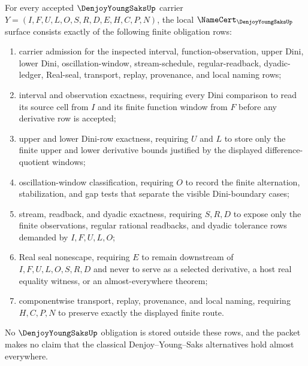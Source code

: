\begin{theorem}\label{thm:denjoy-young-saks-namecert-obligations}
For every accepted $\DenjoyYoungSaksUp$ carrier $Y=(I,F,U,L,O,S,R,D,E,H,C,P,N)$, the local $\NameCert_{\DenjoyYoungSaksUp}$ surface consists exactly of the following finite obligation rows:
\begin{enumerate}
\item carrier admission for the inspected interval, function-observation, upper Dini, lower Dini, oscillation-window, stream-schedule, regular-readback, dyadic-ledger, Real-seal, transport, replay, provenance, and local naming rows;
\item interval and observation exactness, requiring every Dini comparison to read its source cell from $I$ and its finite function window from $F$ before any derivative row is accepted;
\item upper and lower Dini-row exactness, requiring $U$ and $L$ to store only the finite upper and lower derivative bounds justified by the displayed difference-quotient windows;
\item oscillation-window classification, requiring $O$ to record the finite alternation, stabilization, and gap tests that separate the visible Dini-boundary cases;
\item stream, readback, and dyadic exactness, requiring $S,R,D$ to expose only the finite observations, regular rational readbacks, and dyadic tolerance rows demanded by $I,F,U,L,O$;
\item Real seal nonescape, requiring $E$ to remain downstream of $I,F,U,L,O,S,R,D$ and never to serve as a selected derivative, a host real equality witness, or an almost-everywhere theorem;
\item componentwise transport, replay, provenance, and local naming, requiring $H,C,P,N$ to preserve exactly the displayed finite route.
\end{enumerate}
No $\DenjoyYoungSaksUp$ obligation is stored outside these rows, and the packet makes no claim that the classical Denjoy--Young--Saks alternatives hold almost everywhere.
\end{theorem}
